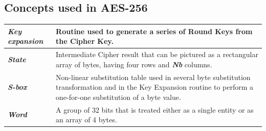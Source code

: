 \documentclass[a4paper, 10pt]{article}
\begin{document}
\begin{multicols}{2}
            \subsection{Concepts used in AES-256}
                    \noindent
                    \begin{tabular}{m{2cm} m{5cm}}
                        \textbf{\textit{Key expansion}} & Routine used to generate a series of Round Keys from the Cipher Key.\\
                        \hline
                        \textbf{\textit{State}} & Intermediate Cipher result that can be pictured as a rectangular array
                        of bytes, having four rows and \textbf{\textit{Nb}} columns.\\
                        \hline
                        \textbf{\textit{S-box}} & Non-linear substitution table used in several byte substitution transformation and in the Key Expansion routine to perform a one-for-one substitution of a byte value.\\
                        \hline
                        \textbf{\textit{Word}} & A group of 32 bits that is treated either as a single entity or as an array of 4 bytes.\\
                    \end{tabular}
            

\end{multicols}
\end{document}
